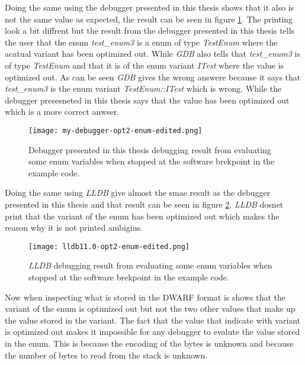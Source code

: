 Doing the same using the debugger presented in this thesis shows that it also is not the same value as expected, the result can be seen in  figure \ref{fig:mydebuggerenum}.
The printing look a bit diffrent but the result from the debugger presented in this thesis tells the user that the enum \emph{test\_enum3} is a enum of type \emph{TestEnum} where the acatual variant has been optimized out.
While \emph{GDB} also tells that \emph{test\_enum3} is of type \emph{TestEnum} and that it is of the enum variant \emph{ITest} where the value is optimized out.
As can be seen \emph{GDB} gives the wrong answere because it says that \emph{test\_enum3} is the enum variant \emph{TestEnum::ITest} which is wrong.
While the debugger presesneted in this thesis says that the value has been optimized out which is a more correct anwser.


\begin{figure}[h]
	\centering
	\texttt{[image: my-debugger-opt2-enum-edited.png]}
	\caption{Debugger presented in this thesis debugging result from evaluating some enum variables when stopped at the software brekpoint in the example code.}
	\label{fig:mydebuggerenum}
\end{figure}


Doing the same using \emph{LLDB} give almost the smae result as the debugger presented in this thesis and that result can be seen in figure \ref{fig:lldbenum}.
\emph{LLDB} dosnet print that the variant of the enum has been optimized out which makes the reason why it is not printed ambigius.


\begin{figure}[h]
	\centering
	\texttt{[image: lldb11.0-opt2-enum-edited.png]}
	\caption{\emph{LLDB} debugging result from evaluating some enum variables when stopped at the software brekpoint in the example code.}
	\label{fig:lldbenum}
\end{figure}


Now when inspecting what is stored in the \gls{DWARF} format is shows that the variant of the enum is optimized out but not the two other values that make up the value stored in the variant.
The fact that the value that indicate with variant is optimized out makes it impossible for any debugger to evalute the value stored in the enum.
This is because the encoding of the bytes is unknown and because the number of bytes to read from the stack is unknown.


